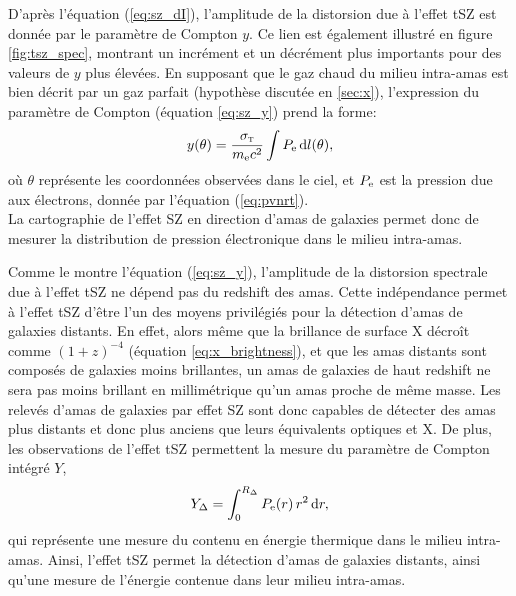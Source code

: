 D'après l'équation (\ref{eq:sz_dI}), l'amplitude de la distorsion due à l'effet tSZ est donnée par le paramètre de Compton $y$.
Ce lien est également illustré en figure \ref{fig:tsz_spec}, montrant un incrément et un décrément plus importants pour des valeurs de $y$ plus élevées.
En supposant que le gaz chaud du milieu intra-amas est bien décrit par un gaz parfait (hypothèse discutée en \ref{sec:x}), l'expression du paramètre de Compton (équation \ref{eq:sz_y}) prend la forme:
\begin{equation}
    \label{}
    y(\theta) = \frac{\sigma_\textsc{t}}{m_{\rm e} c^2} \int P_{\rm e} \, \mathrm{d} l(\theta),
\end{equation}
où $\theta$ représente les coordonnées observées dans le ciel, et $P_{\rm e}$ est la pression due aux électrons, donnée par l'équation (\ref{eq:pvnrt}). \\
La cartographie de l'effet SZ en direction d'amas de galaxies permet donc de mesurer la distribution de pression électronique dans le milieu intra-amas.

Comme le montre l'équation (\ref{eq:sz_y}), l'amplitude de la distorsion spectrale due à l'effet tSZ ne dépend pas du redshift des amas.
Cette indépendance permet à l'effet tSZ d'être l'un des moyens privilégiés pour la détection d'amas de galaxies distants.
En effet, alors même que la brillance de surface X décroît comme $(1+z)^{-4}$ (équation \ref{eq:x_brightness}), et que les amas distants sont composés de galaxies moins brillantes, un amas de galaxies de haut redshift ne sera pas moins brillant en millimétrique qu'un amas proche de même masse.
Les relevés d'amas de galaxies par effet SZ sont donc capables de détecter des amas plus distants et donc plus anciens que leurs équivalents optiques et X.
De plus, les observations de l'effet tSZ permettent la mesure du paramètre de Compton intégré $Y$,
\begin{equation}
    \label{eq:sz_yinteg}
    Y_\Delta = \int_0^{R_\Delta} P_{\rm e}(r) \, r^2 \, \mathrm{d} r,
\end{equation}
qui représente une mesure du contenu en énergie thermique dans le milieu intra-amas.
Ainsi, l'effet tSZ permet la détection d'amas de galaxies distants, ainsi qu'une mesure de l'énergie contenue dans leur milieu intra-amas.

